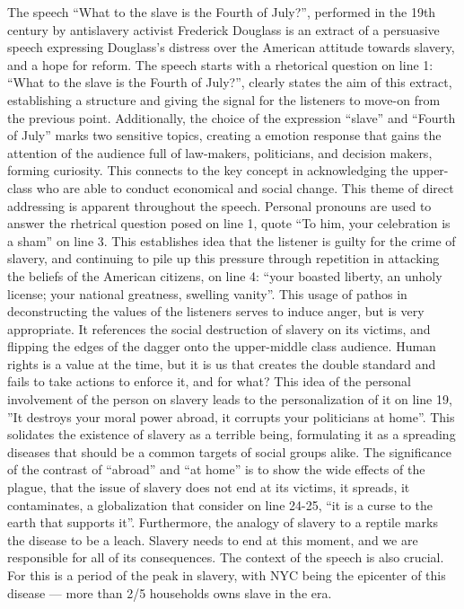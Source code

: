 \documentclass[a4paper,12pt]{article}
\begin{document}
The speech ``What to the slave is the Fourth of July?'', performed in the 19th century by antislavery activist Frederick Douglass is an extract of a persuasive speech expressing Douglass's distress over the American attitude towards slavery, and a hope for reform.
The speech starts with a rhetorical question on line 1: ``What to the slave is the Fourth of July?'', clearly states the aim of this extract, establishing a structure and giving the signal for the listeners to move-on from the previous point. Additionally, the choice of the expression ``slave'' and ``Fourth of July'' marks two sensitive topics, creating a emotion response that gains the attention of the audience full of law-makers, politicians, and decision makers, forming curiosity. This connects to the key concept in acknowledging the upper-class who are able to conduct economical and social change.
This theme of direct addressing is apparent throughout the speech. Personal pronouns are used to answer the rhetrical question posed on line 1, quote ``To him, your celebration is a sham'' on line 3. This establishes idea that the listener is guilty for the crime of slavery, and continuing to pile up this pressure through repetition in attacking the beliefs of the American citizens, on line 4: ``your boasted liberty, an unholy license; your national greatness, swelling vanity''. This usage of pathos in deconstructing the values of the listeners serves to induce anger, but is very appropriate. It references the social destruction of slavery on its victims, and flipping the edges of the dagger onto the upper-middle class audience. Human rights is a value at the time, but it is us that creates the double standard and fails to take actions to enforce it, and for what?
This idea of the personal involvement of the person on slavery leads to the personalization of it on line 19, ''It destroys your moral power abroad, it corrupts your politicians at home''. This solidates the existence of slavery as a terrible being, formulating it as a spreading diseases that should be a common targets of social groups alike. The significance of the contrast of ``abroad'' and ``at home'' is to show the wide effects of the plague, that the issue of slavery does not end at its victims, it spreads, it contaminates, a globalization that consider on line 24-25, ``it is a curse to the earth that supports it''. Furthermore, the analogy of slavery to a reptile marks the disease to be a leach. Slavery needs to end at this moment, and we are responsible for all of its consequences.
The context of the speech is also crucial. For this is a period of the peak in slavery, with NYC being the epicenter of this disease --- more than 2/5 households owns slave in the era.
\end{document}
